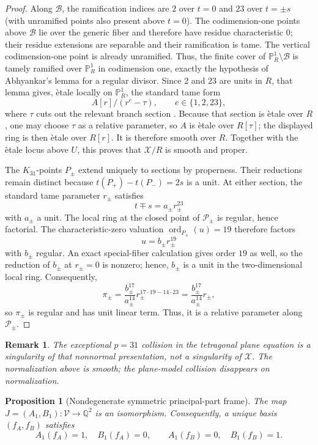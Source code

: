 \documentclass[11pt]{article}
\newtheorem{proposition}[theorem]{Proposition}
\newtheorem{remark}[theorem]{Remark}
\newcommand{\Q}{\mathbb Q}
\newcommand{\PP}{\mathbb P}
\begin{document}
\begin{proof}
Along $\mathcal B$, the ramification indices are $2$ over $t=0$ and $23$ over $t=\pm s$ (with unramified points also present above $t=0$).  The codimension-one points above $\mathcal B$ lie over the generic fiber and therefore have residue characteristic $0$; their residue extensions are separable and their ramification is tame.  The vertical codimension-one point is already unramified.  Thus, the finite cover of $\PP^1_R\setminus\mathcal B$ is tamely ramified over $\PP^1_R$ in codimension one, exactly the hypothesis of Abhyankar's lemma for a regular divisor.  Since $2$ and $23$ are units in $R$, that lemma gives, \`etale locally on $\PP^1_R$, the standard tame form
\[
A[r]/(r^e-\tau),\qquad e\in\{1,2,23\},
\]
where $\tau$ cuts out the relevant branch section \cite[Tag~0EYG]{StacksProject}.  Because that section is \`etale over $R$, one may choose $\tau$ as a relative parameter, so $A$ is \`etale over $R[\tau]$; the displayed ring is then \`etale over $R[r]$.  It is therefore smooth over $R$.  Together with the \`etale locus above $U$, this proves that $\mathcal X/R$ is smooth and proper.

The $K_{31}$-points $P_\pm$ extend uniquely to sections by properness.  Their reductions remain distinct because $t(P_+)-t(P_-)=2s$ is a unit.  At either section, the standard tame parameter $r_\pm$ satisfies
\[
t\mp s=a_\pm r_\pm^{23}
\]
with $a_\pm$ a unit.  The local ring at the closed point of $\mathcal P_\pm$ is regular, hence factorial.  The characteristic-zero valuation $\operatorname{ord}_{P_\pm}(u)=19$ therefore factors
\[
u=b_\pm r_\pm^{19}
\]
with $b_\pm$ regular.  An exact special-fiber calculation gives order $19$ as well, so the reduction of $b_\pm$ at $r_\pm=0$ is nonzero; hence, $b_\pm$ is a unit in the two-dimensional local ring.  Consequently,
\[
\pi_\pm=\frac{b_\pm^{17}}{a_\pm^{14}}r_\pm^{17\cdot19-14\cdot23}
       =\frac{b_\pm^{17}}{a_\pm^{14}}r_\pm,
\]
so $\pi_\pm$ is regular and has unit linear term.  Thus, it is a relative parameter along $\mathcal P_\pm$.
\end{proof}

\begin{remark}
The exceptional $p=31$ collision in the tetragonal \emph{plane equation} is a singularity of that nonnormal presentation, not a singularity of $\mathcal X$.  The normalization above is smooth; the plane-model collision disappears on normalization.
\end{remark}

\begin{proposition}[Nondegenerate symmetric principal-part frame]\label{prop:principal-rank}
The map $J=(A_1,B_1):\mathcal V\to\Q^2$ is an isomorphism.  Consequently, a unique basis $(f_A,f_B)$ satisfies
\[
A_1(f_A)=1,\quad B_1(f_A)=0,
\qquad
A_1(f_B)=0,\quad B_1(f_B)=1.
\]
\end{proposition}
\end{document}
